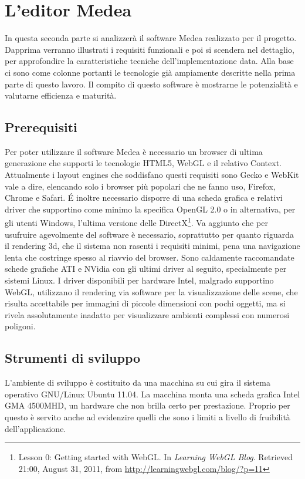 \chapter{L'editor Medea}                 

In questa seconda parte si analizzerà il software Medea realizzato per il progetto. Dapprima verranno illustrati i requisiti funzionali e poi si scendera nel dettaglio, per approfondire la caratteristiche tecniche dell'implementazione data. Alla base ci sono come colonne portanti le tecnologie già ampiamente descritte nella prima parte di questo lavoro. Il compito di questo software è mostrarne le potenzialità e valutarne efficienza e maturità.


\section{Prerequisiti}
Per poter utilizzare il software Medea è necessario un browser di ultima generazione che supporti le tecnologie HTML5, WebGL e il relativo Context. Attualmente i layout engines che soddisfano questi requisiti sono Gecko e WebKit vale a dire, elencando solo i browser più popolari che ne fanno uso, Firefox, Chrome e Safari. 
\'{E} inoltre necessario disporre di una scheda grafica e relativi driver che supportino come minimo la specifica OpenGL 2.0 o in alternativa, per gli utenti Windows, l'ultima versione delle DirectX\footnote{Lesson 0: Getting started with WebGL. In \textit{Learning WebGL Blog}. Retrieved 21:00, August 31, 2011, from \url{http://learningwebgl.com/blog/?p=11}}. Va aggiunto che per usufruire agevolmente del software è necessario, soprattutto per quanto riguarda il rendering 3d, che il sistema non rasenti i requisiti minimi, pena una navigazione lenta che costringe spesso al riavvio del browser. Sono caldamente raccomandate schede grafiche ATI e NVidia con gli ultimi driver al seguito, specialmente per sistemi Linux. I driver disponibili per hardware Intel, malgrado supportino WebGL, utilizzano il rendering via software per la visualizzazione delle scene, che risulta accettabile per immagini di piccole dimensioni con pochi oggetti, ma si rivela assolutamente inadatto per visualizzare ambienti complessi con numerosi poligoni.


\section{Strumenti di sviluppo}
L'ambiente di sviluppo è costituito da una macchina su cui gira il sistema operativo GNU/Linux Ubuntu 11.04. La macchina monta una scheda grafica Intel GMA 4500MHD, un hardware che non brilla certo per prestazione. Proprio per questo è servito anche ad evidenzire quelli che sono i limiti a livello di fruibilità dell'applicazione.

